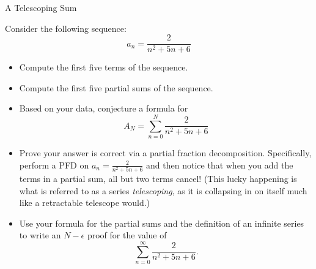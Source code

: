 \begin{exercise}{A Telescoping Sum \Coffeecup \Coffeecup \Coffeecup }

Consider the following sequence: $$ a_n= \frac{2}{n^2+5n+6}$$
\begin{itemize}
\item Compute the first five terms of the sequence.  

\vspace*{1in}

\item Compute the first five partial sums of the sequence.

\vspace*{1in}

\item Based on your data, conjecture a formula for $$ A_N=\sum_{n=0}^{N}  \frac{2}{n^2+5n+6}$$

\vspace*{1in}

\item Prove your answer is correct via a partial fraction decomposition.  Specifically, perform a PFD on $a_n= \frac{2}{n^2+5n+6}$ and then notice that when you add the terms in a partial sum, all but two terms cancel!  (This lucky happening is what is referred to as a series \emph{telescoping}, as it is collapsing in on itself much like a retractable telescope would.)

\vspace*{3in}

\item Use your formula for the partial sums and the definition of an infinite series to write an $N-\epsilon$ proof for the value of $$ \sum_{n=0}^{\infty}  \frac{2}{n^2+5n+6}.$$
\vspace*{3in}

\end{itemize}
\end{exercise}

